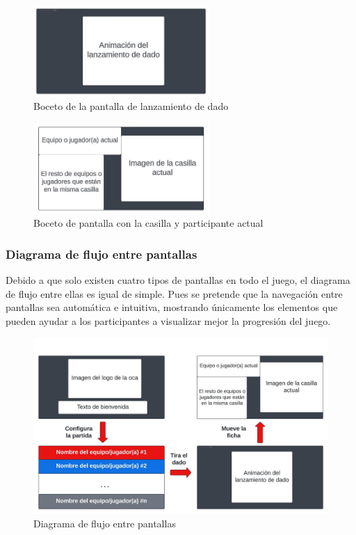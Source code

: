 \begin{figure}[H]
	\centering
	\includegraphics[width=0.6\textwidth]{imgs/boceto-dado.JPG}
	\caption{Boceto de la pantalla de lanzamiento de dado}
	\label{fig:boceto-dado}
\end{figure}

\begin{figure}[H]
	\centering
	\includegraphics[width=0.6\textwidth]{imgs/boceto-casilla.JPG}
	\caption{Boceto de pantalla con la casilla y participante actual}
	\label{fig:boceto-casilla}
\end{figure}

\subsubsection{Diagrama de flujo entre pantallas}

Debido a que solo existen cuatro tipos de pantallas en todo el juego, el diagrama de flujo entre ellas es igual de simple. Pues se pretende que la navegación entre pantallas sea automática e intuitiva, mostrando únicamente los elementos que pueden ayudar a los participantes a visualizar mejor la progresión del juego.

\begin{figure}[H]
	\centering
	\includegraphics[width=1\textwidth]{imgs/diagrama-pantallas.jpeg}
	\caption{Diagrama de flujo entre pantallas}
	\label{fig:diagrama-pantallas}
\end{figure}

